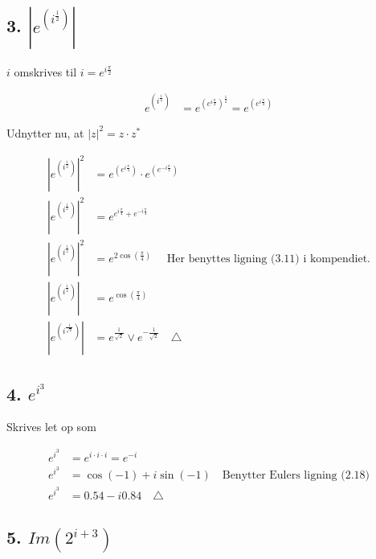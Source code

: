 \documentclass[a4paper, 12pt]{article}
\begin{document}
\subsection*{3. \(\left \lvert e^{\left(i^\frac{1}{2}\right)}\right\rvert\)}
\label{sec:org45138d9}

\(i\) omskrives til \(i=e^{i \frac{\pi}{2}}\)

\begin{align*}
    e^{\left(i^\frac{1}{2}\right)} &= e^{\left(e^{i\frac{\pi}{2}}\right)^{\frac{1}{2}}} =e^{\left(e^{i \frac{\pi}{4}}\right)}
\end{align*}

Udnytter nu, at \(|z|^2 = z \cdot z^*\)

\begin{align*}
    \left \lvert e^{\left(i^\frac{1}{2}\right)}\right\rvert^2 &= e^{\left(e^{i \frac{\pi}{4}}\right)}\cdot e^{\left(e^{-i \frac{\pi}{4}}\right)}  \\
    \left \lvert e^{\left(i^\frac{1}{2}\right)}\right\rvert^2 &= e^{e^{i \frac{\pi}{4}}+e^{-i \frac{\pi}{4}}}  \\
    \left \lvert e^{\left(i^\frac{1}{2}\right)}\right\rvert^2 &= e^{2 \cos\left(\frac{\pi}{4}\right)}  \quad \text{ Her benyttes ligning (3.11) i kompendiet.} \\
    \left \lvert e^{\left(i^\frac{1}{2}\right)}\right\rvert &= e^{ \cos\left(\frac{\pi}{4}\right)}  \\
    \left \lvert e^{\left(i^\frac{1}{\sqrt{2}}\right)}\right\rvert &= e^{\frac{1}{\sqrt{2}}} \lor e^{-\frac{1}{\sqrt{2}}}  \quad \triangle
\end{align*}

\subsection*{4. \(e^{i^3}\)}
\label{sec:org9284bd9}

Skrives let op som

\begin{align*}
e^{i^3} &= e^{i \cdot i \cdot i} = e^{-i}\\
e^{i^3} &= \cos(-1) + i \sin(-1) \quad \text{Benytter Eulers ligning (2.18)}\\
e^{i^3} &= 0.54 - i 0.84  \quad \triangle
\end{align*}

\subsection*{5. \(Im\left(2^{i+3}\right)\)}
\label{sec:org401f617}
\end{document}
